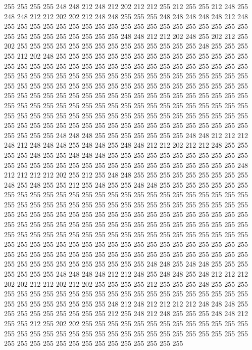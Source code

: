 255 255 255 255 248 248 212 248 212 202 212 212 255 212 255 255 212 248 255 248
248 212 212 202 202 212 248 248 255 255 255 248 248 248 248 248 212 248 255 255
255 255 255 255 255 255 255 255 255 255 255 255 255 255 255 255 255 255 255 255
255 255 255 255 255 255 248 248 212 212 202 248 255 202 212 255 202 255 255 255
255 255 255 255 255 255 255 255 255 255 255 248 255 255 255 255 212 202 248 255
255 255 255 255 255 255 255 255 255 255 255 255 255 255 255 255 255 255 255 255
255 255 255 255 255 255 255 255 255 255 255 255 255 255 255 255 255 255 255 255
255 255 255 255 255 255 255 255 255 255 255 255 255 255 255 255 255 255 255 255
255 255 255 255 255 255 255 255 255 255 255 255 255 255 255 255 255 255 255 255
255 255 255 255 255 255 255 255 255 255 255 255 255 255 255 255 255 255 255 255
255 255 255 255 255 255 255 255 255 255 255 255 255 255 255 255 255 255 255 255
255 255 255 255 255 255 255 255 255 255 255 255 255 255 255 255 255 255 255 255
255 255 255 255 255 255 255 255 255 255 255 248 248 248 255 255 255 255 255 255
255 248 248 212 212 212 248 212 248 248 248 255 248 248 255 248 248 212 212 202
212 212 248 255 255 255 255 248 255 255 248 248 248 255 255 255 255 255 255 255
255 255 255 255 255 255 255 255 255 255 255 255 255 255 255 255 255 255 255 255
255 255 248 212 212 212 212 202 255 212 255 248 248 255 255 255 255 255 255 255
255 255 248 255 248 255 255 212 255 248 255 255 248 248 255 255 255 255 255 255
255 255 255 255 255 255 255 255 255 255 255 255 255 255 255 255 255 255 255 255
255 255 255 255 255 255 255 255 255 255 255 255 255 255 255 255 255 255 255 255
255 255 255 255 255 255 255 255 255 255 255 255 255 255 255 255 255 255 255 255
255 255 255 255 255 255 255 255 255 255 255 255 255 255 255 255 255 255 255 255
255 255 255 255 255 255 255 255 255 255 255 255 255 255 255 255 255 255 255 255
255 255 255 255 255 255 255 255 255 255 255 255 255 255 255 255 255 255 255 255
255 255 255 255 255 255 255 255 255 255 255 255 255 255 255 255 255 255 255 255
255 255 255 255 255 248 248 255 248 248 255 255 255 255 255 255 255 248 248 248
248 212 212 248 255 248 248 255 248 212 212 212 202 202 212 212 202 212 202 255
255 255 255 212 255 255 255 248 255 255 255 255 255 255 255 255 255 255 255 255
255 255 255 255 255 255 255 255 255 255 255 255 255 255 255 255 255 255 248 212
248 212 212 212 212 248 248 248 255 255 255 255 255 255 255 255 255 212 255 248
212 248 255 255 255 248 248 212 255 255 212 255 202 202 255 255 255 255 255 255
255 255 255 255 255 255 255 255 255 255 255 255 255 255 255 255 255 255 255 255
255 255 255 255 255 255 255 255 255 255 255 255 255 255 255 255 255 255 255 255
